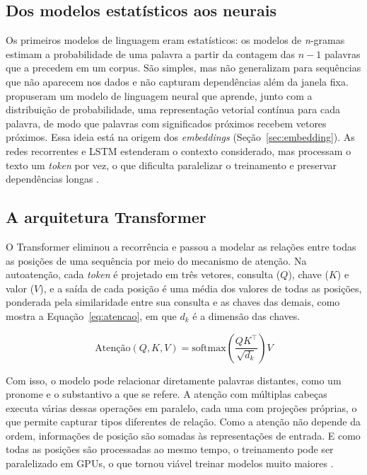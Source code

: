 \subsection{Dos modelos estatísticos aos neurais}

Os primeiros modelos de linguagem eram estatísticos: os modelos de \textit{n}-gramas estimam a probabilidade de uma palavra a partir da contagem das $n-1$ palavras que a precedem em um corpus. São simples, mas não generalizam para sequências que não aparecem nos dados e não capturam dependências além da janela fixa.  propuseram um modelo de linguagem neural que aprende, junto com a distribuição de probabilidade, uma representação vetorial contínua para cada palavra, de modo que palavras com significados próximos recebem vetores próximos. Essa ideia está na origem dos \textit{embeddings} (Seção~\ref{sec:embedding}). As redes recorrentes e LSTM estenderam o contexto considerado, mas processam o texto um \textit{token} por vez, o que dificulta paralelizar o treinamento e preservar dependências longas \cite{Hochreiter1997}.

\subsection{A arquitetura Transformer}

O Transformer \cite{Vaswani2017} eliminou a recorrência e passou a modelar as relações entre todas as posições de uma sequência por meio do mecanismo de atenção. Na autoatenção, cada \textit{token} é projetado em três vetores, consulta ($Q$), chave ($K$) e valor ($V$), e a saída de cada posição é uma média dos valores de todas as posições, ponderada pela similaridade entre sua consulta e as chaves das demais, como mostra a Equação~\ref{eq:atencao}, em que $d_k$ é a dimensão das chaves.

\begin{equation}
	\label{eq:atencao}
	\mathrm{Atenção}(Q, K, V) = \mathrm{softmax}\!\left(\frac{QK^{\top}}{\sqrt{d_k}}\right) V
\end{equation}

Com isso, o modelo pode relacionar diretamente palavras distantes, como um pronome e o substantivo a que se refere. A atenção com múltiplas cabeças executa várias dessas operações em paralelo, cada uma com projeções próprias, o que permite capturar tipos diferentes de relação. Como a atenção não depende da ordem, informações de posição são somadas às representações de entrada. E como todas as posições são processadas ao mesmo tempo, o treinamento pode ser paralelizado em GPUs, o que tornou viável treinar modelos muito maiores \cite{Vaswani2017}.

